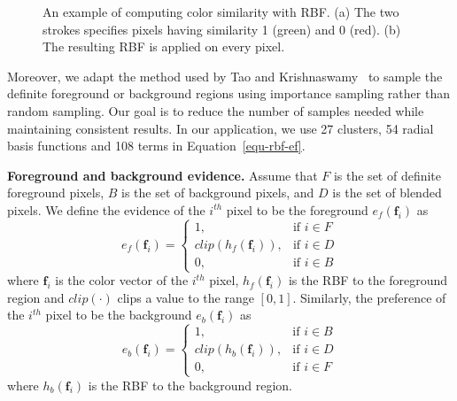 \begin{figure}
	\centering
	\caption{An example of computing color similarity with RBF. (a) The two strokes specifies pixels having similarity 1 (green) and 0 (red). (b) The resulting RBF is applied on every pixel.}
	\label{fig-image-matting}
\end{figure}

Moreover, we adapt the method used by Tao and Krishnaswamy~\cite{tao2012} to sample the definite foreground or background regions using importance sampling rather than random sampling. Our goal is to reduce the number of samples needed while maintaining consistent results.
In our application, we use 27 clusters, 54 radial basis functions and 108 terms in Equation~\ref{equ-rbf-ef}.

\textbf{Foreground and background evidence.}
Assume that $F$ is the set of definite foreground pixels, $B$ is the set of background pixels, and $D$ is the set of blended pixels. We define the evidence of the $i^{th}$ pixel to be the foreground $e_{f}(\mathbf{f}_{i})$ as
\begin{equation}
	\label{equ-ef}
	e_{f}(\mathbf{f}_{i})=
		\begin{cases}
			1, & \text{if } i\in F\\
			clip(h_{f}(\mathbf{f}_{i})), & \text{if } i\in D\\
			0, & \text{if } i\in B
		\end{cases}
\end{equation}
where $\mathbf{f}_{i}$ is the color vector of the $i^{th}$ pixel, $h_{f}(\mathbf{f}_{i})$ is the RBF to the foreground region and $clip(\cdot)$ clips a value to the range $[0,1]$. Similarly, the preference of the $i^{th}$ pixel to be the background $e_{b}(\mathbf{f}_{i})$ as
\begin{equation}
	\label{equ-eb}
	e_{b}(\mathbf{f}_{i})=
		\begin{cases}
			1, & \text{if } i\in B\\
			clip(h_{b}(\mathbf{f}_{i})), & \text{if } i\in D\\
			0, & \text{if } i\in F
		\end{cases}
\end{equation}
where $h_{b}(\mathbf{f}_{i})$ is the RBF to the background region.


